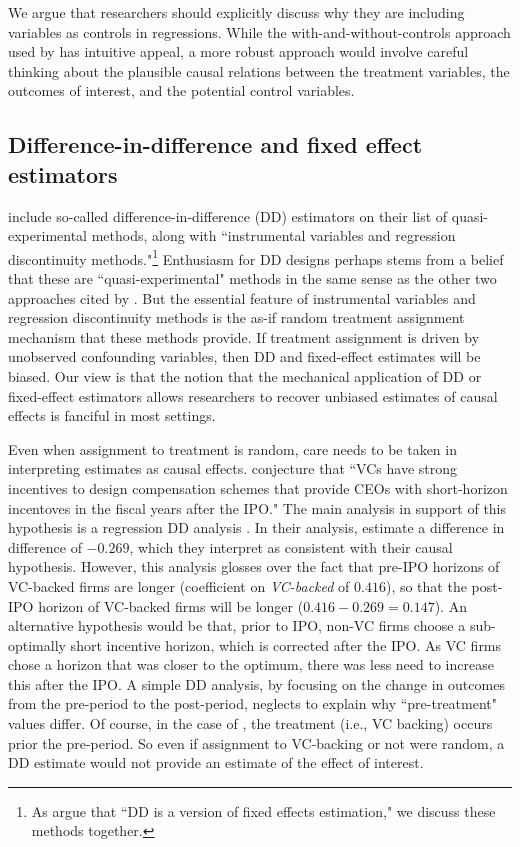 \documentclass[11pt,reqno]{amsart}
\begin{document}
We argue that researchers should explicitly discuss why they are including variables as controls in regressions.
While the with-and-without-controls approach used by \citet{Larcker:2011bw} has intuitive appeal, a more robust approach would involve careful thinking about the plausible causal relations between the treatment variables, the outcomes of interest, and the potential control variables.

\subsection{Difference-in-difference and fixed effect estimators}
\citet[p.\,12]{Angrist:2010jv} include so-called difference-in-difference (DD) estimators on their list of quasi-experimental methods, along with ``instrumental variables and regression discontinuity methods."\footnote{As \citet[p.\,228]{Angrist:2008vk} argue that ``DD is a version of fixed effects estimation," we discuss these methods together.}
Enthusiasm for DD designs perhaps stems from a belief that these are ``quasi-experimental" methods in the same sense as the other two approaches cited by \citet[p.\,12]{Angrist:2010jv}.
But the essential feature of instrumental variables and regression discontinuity methods is the as-if random treatment assignment mechanism that these methods provide.
If treatment assignment is driven by unobserved confounding variables, then DD and fixed-effect estimates will be biased.
Our view is that the notion that the mechanical application of DD or fixed-effect estimators allows researchers to recover unbiased estimates of causal effects is fanciful in most settings.

Even when assignment to treatment is random, care needs to be taken in interpreting estimates as causal effects.
\citet[p.\,1305]{Cadman:2014cr} conjecture that ``VCs have strong incentives to design compensation schemes that provide CEOs with short-horizon incentoves in the fiscal years after the IPO." 
The main analysis in support of this hypothesis is a regression DD analysis \citep[pp.\,233--241]{Angrist:2008vk}. 
In their analysis, \citet[Table 4, Panel A]{Cadman:2014cr} estimate a difference in difference of $-0.269$, which they interpret as consistent with their causal hypothesis.
However, this analysis glosses over the fact that pre-IPO horizons of VC-backed firms are longer (coefficient on \emph{VC-backed} of $0.416$), so that the post-IPO horizon of VC-backed firms will be longer ($0.416-0.269=0.147$).
An alternative hypothesis would be that, prior to IPO, non-VC firms choose a sub-optimally short incentive horizon, which is corrected after the IPO. 
As VC firms chose a horizon that was closer to the optimum, there was less need to increase this after the IPO.
A simple DD analysis, by focusing on the change in outcomes from the pre-period to the post-period, neglects to explain why ``pre-treatment" values differ.
Of course, in the case of \citet{Cadman:2014cr}, the treatment (i.e., VC backing) occurs prior the pre-period.
So even if assignment to VC-backing  or not were random, a DD estimate would not provide an estimate of the effect of interest.
\end{document}
